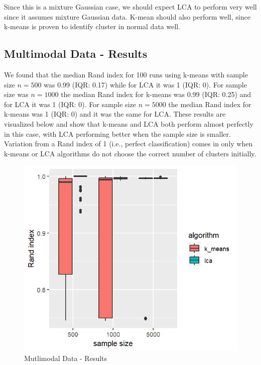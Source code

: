\documentclass[
]{article}
\begin{document}
Since this is a mixture Gaussian case, we should expect LCA to perform
very well since it assumes mixture Gaussian data. K-mean should also
perform well, since k-means is proven to identify cluster in normal data
well.

\hypertarget{multimodal-data---results}{%
\subsection{Multimodal Data - Results}\label{multimodal-data---results}}

We found that the median Rand index for 100 runs using k-means with
sample size \(n=500\) was 0.99 (IQR: 0.17) while for LCA it was 1 (IQR:
0). For sample size was \(n=1000\) the median Rand index for k-means was
0.99 (IQR: 0.25) and for LCA it was 1 (IQR: 0). For sample size
\(n=5000\) the median Rand index for k-means was 1 (IQR: 0) and it was
the same for LCA. These results are visualized below and show that
k-means and LCA both perform almost perfectly in this case, with LCA
performing better when the sample size is smaller. Variation from a Rand
index of 1 (i.e., perfect classification) comes in only when k-means or
LCA algorithms do not choose the correct number of clusters initially.

\begin{figure}
\centering
\includegraphics{report_image/multimodal_results.png}
\caption{Mutlimodal Data - Results}
\end{figure}
\end{document}
